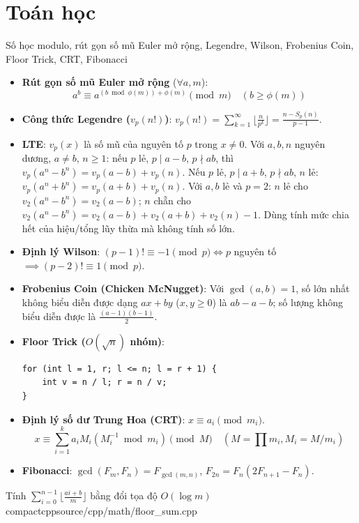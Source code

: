 \section{Toán học}

{Số học modulo, rút gọn số mũ Euler mở rộng, Legendre, Wilson, Frobenius Coin, Floor Trick, CRT, Fibonacci}
{}
{}{}

\begin{itemize}
    \item \textbf{Rút gọn số mũ Euler mở rộng} ($\forall a, m$):
    $$ a^b \equiv a^{(b \bmod \phi(m)) + \phi(m)} \pmod m \quad (b \ge \phi(m)) $$
    \item \textbf{Công thức Legendre ($v_p(n!)$)}: $v_p(n!) = \sum_{k=1}^\infty \lfloor \frac{n}{p^k} \rfloor = \frac{n - S_p(n)}{p - 1}$.
    \item \textbf{LTE}: $v_p(x)$ là số mũ của nguyên tố $p$ trong $x\ne0$. Với $a,b,n$ nguyên dương, $a\ne b$, $n\ge1$: nếu $p$ lẻ, $p\mid a-b$, $p\nmid ab$, thì $v_p(a^n-b^n)=v_p(a-b)+v_p(n)$. Nếu $p$ lẻ, $p\mid a+b$, $p\nmid ab$, $n$ lẻ: $v_p(a^n+b^n)=v_p(a+b)+v_p(n)$. Với $a,b$ lẻ và $p=2$: $n$ lẻ cho $v_2(a^n-b^n)=v_2(a-b)$; $n$ chẵn cho $v_2(a^n-b^n)=v_2(a-b)+v_2(a+b)+v_2(n)-1$. Dùng tính mức chia hết của hiệu/tổng lũy thừa mà không tính số lớn.
    \item \textbf{Định lý Wilson}: $(p - 1)! \equiv -1 \pmod p \iff p$ nguyên tố $\implies (p - 2)! \equiv 1 \pmod p$.
    \item \textbf{Frobenius Coin (Chicken McNugget)}: Với $\gcd(a,b)=1$, số lớn nhất không biểu diễn được dạng $ax+by$ ($x,y\ge0$) là $ab-a-b$; số lượng không biểu diễn được là $\frac{(a-1)(b-1)}{2}$.
    \item \textbf{Floor Trick ($O(\sqrt{n})$ nhóm)}:
\begin{lstlisting}
for (int l = 1, r; l <= n; l = r + 1) {
    int v = n / l; r = n / v;
}
\end{lstlisting}
    \item \textbf{Định lý số dư Trung Hoa (CRT)}: $x \equiv a_i \pmod{m_i}$.
    $$ x \equiv \sum_{i=1}^k a_i M_i (M_i^{-1} \bmod m_i) \pmod M \quad (M = \prod m_i, M_i = M/m_i) $$
    \item \textbf{Fibonacci}: $\gcd(F_m, F_n) = F_{\gcd(m, n)}$, $F_{2n} = F_n(2F_{n+1} - F_n)$.
\end{itemize}

{Tính $\sum_{i=0}^{n-1} \lfloor \frac{ai+b}{m} \rfloor$ bằng đổi tọa độ}
{$O(\log m)$}
{compactcpp}{source/cpp/math/floor_sum.cpp}


